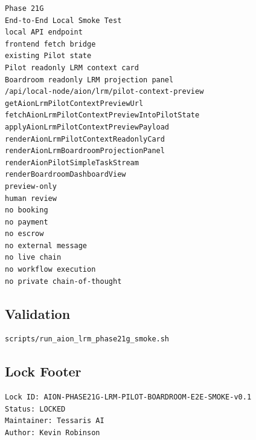\begin{verbatim}
Phase 21G
End-to-End Local Smoke Test
local API endpoint
frontend fetch bridge
existing Pilot state
Pilot readonly LRM context card
Boardroom readonly LRM projection panel
/api/local-node/aion/lrm/pilot-context-preview
getAionLrmPilotContextPreviewUrl
fetchAionLrmPilotContextPreviewIntoPilotState
applyAionLrmPilotContextPreviewPayload
renderAionLrmPilotContextReadonlyCard
renderAionLrmBoardroomProjectionPanel
renderAionPilotSimpleTaskStream
renderBoardroomDashboardView
preview-only
human review
no booking
no payment
no escrow
no external message
no live chain
no workflow execution
no private chain-of-thought
\end{verbatim}

\subsection{Validation}

\begin{verbatim}
scripts/run_aion_lrm_phase21g_smoke.sh
\end{verbatim}

\subsection{Lock Footer}

\begin{verbatim}
Lock ID: AION-PHASE21G-LRM-PILOT-BOARDROOM-E2E-SMOKE-v0.1
Status: LOCKED
Maintainer: Tessaris AI
Author: Kevin Robinson
\end{verbatim}
